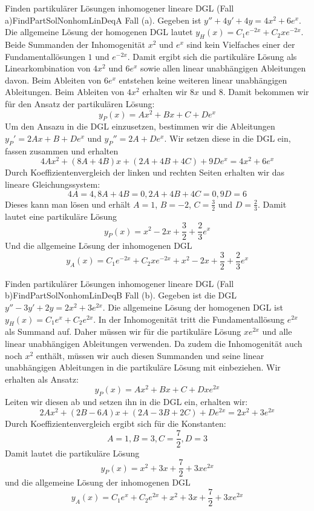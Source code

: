 \begin{example}{Finden partikulärer Lösungen inhomogener lineare DGL (Fall a)}{FindPartSolNonhomLinDeqA}
    Fall (a). Gegeben ist $y''+4y'+4y = 4x^2+6e^x$. Die allgemeine Lösung der homogenen DGL lautet $y_H(x) = C_1 e^{-2x}+ C_2 x e^{-2x}$. Beide Summanden der Inhomogenität $x^2$ und $e^x$ sind kein Vielfaches einer der Fundamentallösungen $1$ und $e^{-2x}$. Damit ergibt sich die partikuläre Lösung als Linearkombination von $4x^2$ und $6e^x$ sowie allen linear unabhängigen Ableitungen davon. Beim Ableiten von $6e^x$ entstehen keine weiteren linear unabhängigen Ableitungen. Beim Ableiten von $4x^2$ erhalten wir $8x$ und $8$. Damit bekommen wir für den Ansatz der partikulären Lösung:
    $$
        y_P(x) = Ax^2+Bx+C+De^x
    $$
    Um den Ansazu in die DGL einzusetzen, bestimmen wir die Ableitungen $y_P'=2Ax+B+De^x$ und $y_P''=2A+De^x$. Wir setzen diese in die DGL ein, fassen zusammen und erhalten
    $$
        4Ax^2+(8A+4B)x+(2A+4B+4C)+9De^x = 4x^2 + 6e^x
    $$
    Durch Koeffizientenvergleich der linken und rechten Seiten erhalten wir das lineare Gleichungssystem:
    $$
        4A = 4, 8A+4B=0, 2A+4B+4C=0, 9D=6
    $$
    Dieses kann man lösen und erhält $A=1$, $B=-2$, $C=\frac{3}{2}$ und $D=\frac{2}{3}$. Damit lautet eine partikuläre Lösung
    $$
        y_P(x) = x^2 - 2x +\frac{3}{2} + \frac{2}{3}e^x
    $$
    Und die allgemeine Lösung der inhomogenen DGL
    $$
        y_A(x) = C_1  e^{-2x} + C_2 x e^{-2x} + x^2 - 2x +\frac{3}{2} + \frac{2}{3}e^x
    $$
\end{example}

\begin{example}{Finden partikulärer Lösungen inhomogener lineare DGL (Fall b)}{FindPartSolNonhomLinDeqB}
    Fall (b). Gegeben ist die DGL $y''-3y'+2y=2x^2+3e^{2x}$. Die allgemeine Lösung der homogenen DGL ist $y_H(x) = C_1 e^x + C_2 e^{2x}$. In der Inhomogenität tritt die Fundamentallösung $e^{2x}$ als Summand auf. Daher müssen wir für die partikuläre Lösung $x e^{2x}$ und alle linear unabhängigen Ableitungen verwenden. Da zudem die Inhomogenität auch noch $x^2$ enthält, müssen wir auch diesen Summanden und seine linear unabhängigen Ableitungen in die partikuläre Lösung mit einbeziehen. Wir erhalten als Ansatz:
    $$
        y_P(x) = A x^2+Bx+C+Dxe^{2x}
    $$
    Leiten wir diesen ab und setzen ihn in die DGL ein, erhalten wir:
    $$
        2Ax^2 + (2B-6A)x + (2A-3B+2C) + De^{2x} = 2x^2 + 3e^{2x}
    $$
    Durch Koeffizientenvergleich ergibt sich für die Konstanten:
    $$
        A = 1, B=3, C=\frac{7}{2}, D=3
    $$
    Damit lautet die partikuläre Lösung
    $$
        y_P(x) = x^2+3x+\frac{7}{2}+3xe^{2x}
    $$
    und die allgemeine Lösung der inhomogenen DGL
    $$
        y_A(x) = C_1 e^x + C_2 e^{2x} + x^2+3x+\frac{7}{2}+3xe^{2x}
    $$
\end{example}

